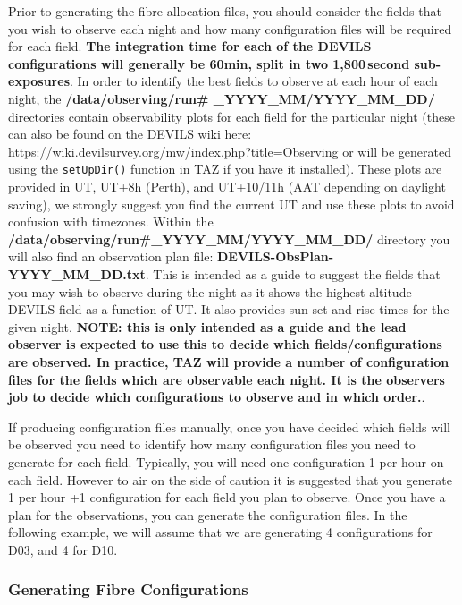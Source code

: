 \documentclass[12pt]{article}
\begin{document}
Prior to generating the fibre allocation files, you should consider the fields that you wish to observe each night and how many configuration files will be required for each field. \textbf{The integration time for each of the DEVILS configurations will generally be 60min, split in two 1,800\,second sub-exposures}. In order to identify the best fields to observe at each hour of each night, the \textbf{/data/observing/run\# \_YYYY\_MM/YYYY\_MM\_DD/} directories contain observability plots for each field for the particular night (these can also be found on the DEVILS wiki here: \url{https://wiki.devilsurvey.org/mw/index.php?title=Observing} or will be generated using the \texttt{setUpDir()} function in TAZ if you have it installed). These plots are provided in UT, UT+8h (Perth), and UT+10/11h (AAT depending on daylight saving), we strongly suggest you find the current UT and use these plots to avoid confusion with timezones. Within the \textbf{/data/observing/run\#\_YYYY\_MM/YYYY\_MM\_DD/}  directory you will also find an observation plan file: \textbf{DEVILS-ObsPlan-YYYY\_MM\_DD.txt}. This is intended as a guide to suggest the fields that you may wish to observe during the night as it shows the highest altitude DEVILS field as a function of UT. It also provides sun set and rise times for the given night. \textbf{\textcolor{PineGreen}{NOTE:
 this is only intended as a guide and the lead observer is expected to use this to decide which fields/configurations are observed.  In practice, TAZ will provide a number of configuration files for the fields which are observable each night. It is the observers job to decide which configurations to observe and in which order.}}.

If producing configuration files manually, once you have decided which fields will be observed you need to identify how many configuration files you need to generate for each field. Typically, you will need one configuration 1 per hour on each field. However to air on the side of caution it is suggested that you generate 1 per hour +1 configuration for each field you plan to observe. Once you have a plan for the observations, you can generate the configuration files. In the following example, we will assume that we are generating 4 configurations for D03, and 4 for D10.      


\subsubsection{Generating Fibre Configurations}
\end{document}
